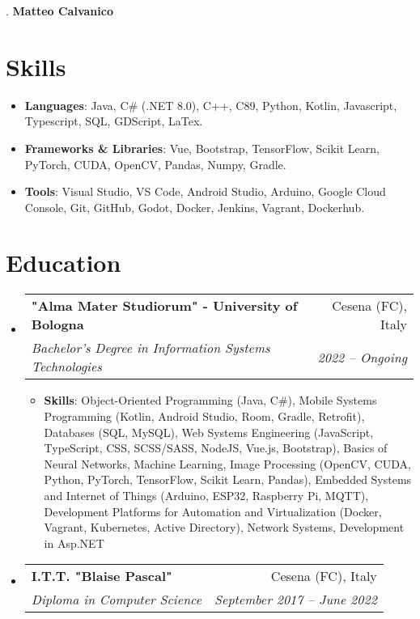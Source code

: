 \documentclass[letterpaper,11pt]{article}
\makeatletter
\newcommand{\resumeItem}[2]{
  \item\small{
    \textbf{#1}{: #2 \vspace{-2pt}}
  }
}
\newcommand{\resumeSubheading}[4]{
  \vspace{-1pt}\item
    \begin{tabular*}{0.97\textwidth}{l@{\extracolsep{\fill}}r}
      \textbf{#1} & #2 \\
      \textit{\small#3} & \textit{\small #4} \\
    \end{tabular*}\vspace{-5pt}
}
\newcommand{\resumeSubHeadingListStart}{\begin{itemize}[leftmargin=*]}
\newcommand{\resumeSubHeadingListEnd}{\end{itemize}}
\newcommand{\resumeItemListStart}{\begin{itemize}}
\newcommand{\resumeItemListEnd}{\end{itemize}\vspace{-5pt}}
\makeatother
\begin{document}
\setlength{\footskip}{5pt}.
\centering\textbf{\Large Matteo Calvanico} \\
  \vspace{0.25in}

\section{Skills}
\resumeSubHeadingListStart
  \item{
    \textbf{Languages}{: Java, C\# (.NET 8.0), C++, C89, Python, Kotlin, Javascript, Typescript, SQL, GDScript, LaTex.}
    \hfill
    }
  \item{
    \textbf{Frameworks \& Libraries}{: Vue, Bootstrap, TensorFlow, Scikit Learn, PyTorch, CUDA, OpenCV, Pandas, Numpy, Gradle.}
    \hfill
    }
  \item{
    \textbf{Tools}{: Visual Studio, VS Code, Android Studio, Arduino, Google Cloud Console, Git, GitHub, Godot, Docker, Jenkins, Vagrant, Dockerhub.}
    \hfill
    }
  \resumeSubHeadingListEnd

\section{Education}
  \resumeSubHeadingListStart
    \resumeSubheading
      {"Alma Mater Studiorum" - University of Bologna}{Cesena (FC), Italy}
      {Bachelor's Degree in Information Systems Technologies}{2022 -- Ongoing}
      \resumeItemListStart
          \resumeItem{Skills}{Object-Oriented Programming (Java, C\#), Mobile Systems Programming (Kotlin, Android Studio, Room, Gradle, Retrofit), Databases (SQL, MySQL), Web Systems Engineering (JavaScript, TypeScript, CSS, SCSS/SASS, NodeJS, Vue.js, Bootstrap), Basics of Neural Networks, Machine Learning, Image Processing (OpenCV, CUDA, Python, PyTorch, TensorFlow, Scikit Learn, Pandas), 
          Embedded Systems and Internet of Things (Arduino, ESP32, Raspberry Pi, MQTT), Development Platforms for Automation and Virtualization (Docker, Vagrant, Kubernetes, Active Directory), Network Systems, Development in Asp.NET}
      \resumeItemListEnd
    \resumeSubheading
      {I.T.T. "Blaise Pascal"}{Cesena (FC), Italy}
      {Diploma in Computer Science}{September 2017 -- June 2022}
  \resumeSubHeadingListEnd
\end{document}
